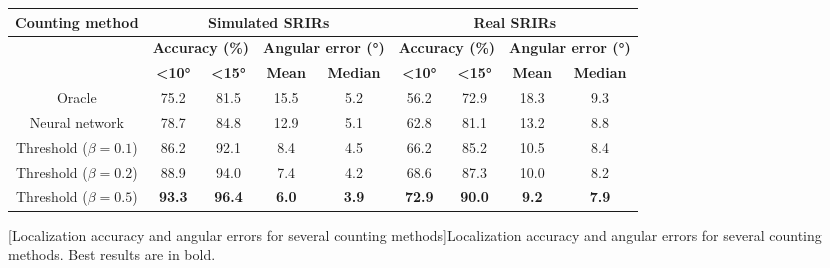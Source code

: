 \begin{table}[t]
\begin{adjustbox}{width=1.1\textwidth,center}
    \begin{tabular}{|c|cccc|cccc|}
    \hline
    \multirow{3}{*}{\textbf{Counting method}} & \multicolumn{4}{c|}{\textbf{Simulated SRIRs}}                                                     & \multicolumn{4}{c|}{\textbf{Real SRIRs}}                                                          \\ \hline
                                              & \multicolumn{2}{c}{\textbf{Accuracy (\%)}}      & \multicolumn{2}{c|}{\textbf{Angular error (°)}} & \multicolumn{2}{c}{\textbf{Accuracy (\%)}}      & \multicolumn{2}{c|}{\textbf{Angular error (°)}} \\
                                              & \textbf{\textless 10°} & \textbf{\textless 15°} & \textbf{Mean}         & \textbf{Median}        & \textbf{\textless 10°} & \textbf{\textless 15°} & \textbf{Mean}         & \textbf{Median}        \\ \hline
    Oracle                           & 75.2                   & 81.5                   & 15.5                  & 5.2                    & 56.2                   & 72.9                   & 18.3                  & 9.3                    \\
    Neural network                   & 78.7                   & 84.8                   & 12.9                  & 5.1                    & 62.8                   & 81.1                   & 13.2                  & 8.8                    \\
    Threshold ($\beta=0.1$)          & 86.2                   & 92.1                   & 8.4                   & 4.5                    & 66.2                   & 85.2                   & 10.5                  & 8.4                    \\
    Threshold ($\beta=0.2$)          & 88.9                   & 94.0                   & 7.4                   & 4.2                    & 68.6                   & 87.3                   & 10.0                  & 8.2                    \\
    Threshold ($\beta=0.5$)          & \textbf{93.3}                   & \textbf{96.4}                   & \textbf{6.0}                   & \textbf{3.9}                    & \textbf{72.9}                   & \textbf{90.0}                   & \textbf{9.2}                   & \textbf{7.9}                   \\ \hline
    \end{tabular}
\end{adjustbox}
[Localization accuracy and angular errors for several counting methods]{Localization accuracy and angular errors for several counting methods. Best results are in bold.}
\label{tab:hybrid_nosPrediction_localization}
\end{table}

